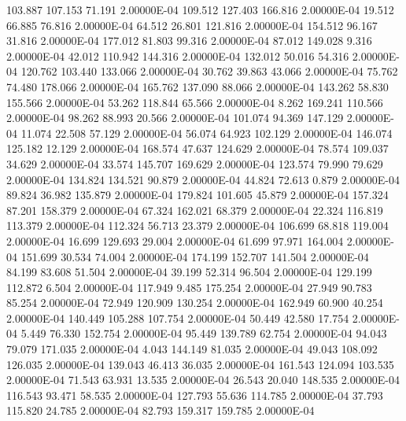    103.887   107.153    71.191  2.00000E-04
   109.512   127.403   166.816  2.00000E-04
    19.512    66.885    76.816  2.00000E-04
    64.512    26.801   121.816  2.00000E-04
   154.512    96.167    31.816  2.00000E-04
   177.012    81.803    99.316  2.00000E-04
    87.012   149.028     9.316  2.00000E-04
    42.012   110.942   144.316  2.00000E-04
   132.012    50.016    54.316  2.00000E-04
   120.762   103.440   133.066  2.00000E-04
    30.762    39.863    43.066  2.00000E-04
    75.762    74.480   178.066  2.00000E-04
   165.762   137.090    88.066  2.00000E-04
   143.262    58.830   155.566  2.00000E-04
    53.262   118.844    65.566  2.00000E-04
     8.262   169.241   110.566  2.00000E-04
    98.262    88.993    20.566  2.00000E-04
   101.074    94.369   147.129  2.00000E-04
    11.074    22.508    57.129  2.00000E-04
    56.074    64.923   102.129  2.00000E-04
   146.074   125.182    12.129  2.00000E-04
   168.574    47.637   124.629  2.00000E-04
    78.574   109.037    34.629  2.00000E-04
    33.574   145.707   169.629  2.00000E-04
   123.574    79.990    79.629  2.00000E-04
   134.824   134.521    90.879  2.00000E-04
    44.824    72.613     0.879  2.00000E-04
    89.824    36.982   135.879  2.00000E-04
   179.824   101.605    45.879  2.00000E-04
   157.324    87.201   158.379  2.00000E-04
    67.324   162.021    68.379  2.00000E-04
    22.324   116.819   113.379  2.00000E-04
   112.324    56.713    23.379  2.00000E-04
   106.699    68.818   119.004  2.00000E-04
    16.699   129.693    29.004  2.00000E-04
    61.699    97.971   164.004  2.00000E-04
   151.699    30.534    74.004  2.00000E-04
   174.199   152.707   141.504  2.00000E-04
    84.199    83.608    51.504  2.00000E-04
    39.199    52.314    96.504  2.00000E-04
   129.199   112.872     6.504  2.00000E-04
   117.949     9.485   175.254  2.00000E-04
    27.949    90.783    85.254  2.00000E-04
    72.949   120.909   130.254  2.00000E-04
   162.949    60.900    40.254  2.00000E-04
   140.449   105.288   107.754  2.00000E-04
    50.449    42.580    17.754  2.00000E-04
     5.449    76.330   152.754  2.00000E-04
    95.449   139.789    62.754  2.00000E-04
    94.043    79.079   171.035  2.00000E-04
     4.043   144.149    81.035  2.00000E-04
    49.043   108.092   126.035  2.00000E-04
   139.043    46.413    36.035  2.00000E-04
   161.543   124.094   103.535  2.00000E-04
    71.543    63.931    13.535  2.00000E-04
    26.543    20.040   148.535  2.00000E-04
   116.543    93.471    58.535  2.00000E-04
   127.793    55.636   114.785  2.00000E-04
    37.793   115.820    24.785  2.00000E-04
    82.793   159.317   159.785  2.00000E-04

